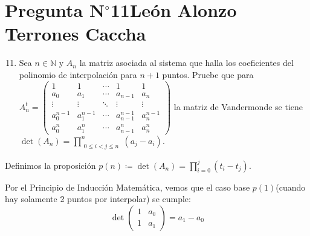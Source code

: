 \section{Pregunta N$^{\circ}$11\qquad León Alonzo Terrones Caccha}



\begin{frame}
	\begin{enumerate}\setcounter{enumi}{10}
		\item

		      Sea $n\in \mathbb{N}$ y $A_n$ la matriz asociada al sistema que halla los coeficientes del polinomio de interpolación para $n+1$ puntos. Pruebe que para $A^{t}_{n}=\begin{pmatrix} 1&1&\cdots & 1 &1\\a_0&a_1&\cdots &a_{n-1}&a_{n}\\\vdots&\vdots&\ddots&\vdots&\vdots\\a_0^{n-1}&a_1^{n-1}&\cdots&a_{n-1}^{n-1}& a_{n}^{n-1}\\a_0^{n}&a_1^{n}&\cdots&a_{n-1}^{n}&a_{n}^{n}\end{pmatrix}$ la matriz de Vandermonde se
		      tiene
		      \begin{math}
			      \det\left(A_{n}\right)=
			      \prod\limits_{\substack{0\leq i< j\leq n}}^{n}
			      \left(a_{j}-a_{i}\right)
		      \end{math}.
	\end{enumerate}

	\begin{solution}

		Definimos la proposición
		\begin{math}
			p\left(n\right)\coloneqq
			\det\left(A_{n}\right)=
			\prod\limits_{i=0}^{j}
			\left(t_{i}-t_{j}\right)
		\end{math}.

		Por el \alert{Principio de Inducción Matemática}, vemos que
		el caso base $p\left(1\right)$(cuando hay solamente 2 puntos por interpolar) se cumple:
	\begin{equation*}
	    \det\begin{pmatrix} 
            1&a_0\\
            1&a_1\end{pmatrix}=a_1-a_0
	\end{equation*}


\end{solution}
\end{frame}
